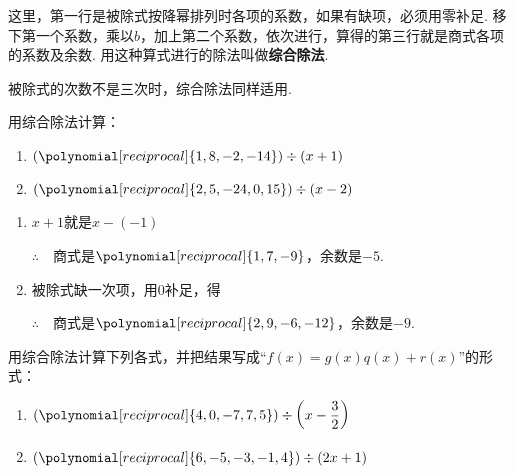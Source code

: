 这里，第一行是被除式按降幂排列时各项的系数，如果有缺项，必须用零补足. 移下第一个系数，乘以$b$，加上第二个系数，依次进行，算得的第三行就是商式各项的系数及余数. 用这种算式进行的除法叫做\textbf{综合除法}.

被除式的次数不是三次时，综合除法同样适用.

\begin{example}
用综合除法计算：
\begin{enumerate}[(1)]
    \item $(\polynomial[reciprocal]{1,8,-2,-14})\div (x+1)$
    \item $(\polynomial[reciprocal]{2,5,-24,0,15})\div(x-2)$
\end{enumerate}
\end{example}

\begin{solution}
\begin{enumerate}[(1)]
    \item $x+1$就是$x-(-1)$
\begin{center}
\end{center}
$\therefore\quad $商式是$\polynomial[reciprocal]{1,7,-9}$，余数是$-5$.
    \item 被除式缺一次项，用0补足，得
 \begin{center}
\end{center}
$\therefore\quad $商式是$\polynomial[reciprocal]{2,9,-6,-12}$，余数是$-9$. 

\end{enumerate}
\end{solution}

\begin{example}
用综合除法计算下列各式，并把结果写成“$f(x)=g(x)q(x)+r(x)$”的形式：
\begin{enumerate}[(1)]
    \item $(\polynomial[reciprocal]{4,0,-7,7,5})\div \left(x-\frac{3}{2}\right)$
    \item $(\polynomial[reciprocal]{6,-5,-3,-1,4})\div (2x+1)$
\end{enumerate}
\end{example}

